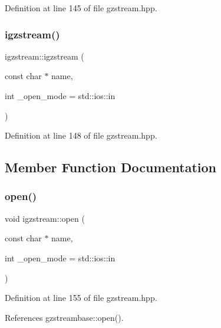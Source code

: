 Definition at line 145 of file gzstream.\+hpp.

\mbox{\label{classigzstream_ae94e48ef452b7009e93a814c48e5924e}} 
\subsubsection{\texorpdfstring{igzstream()}{igzstream()}\hspace{0.1cm}{\footnotesize\ttfamily [2/2]}}
{\footnotesize\ttfamily igzstream\+::igzstream (\begin{DoxyParamCaption}\item[{const char $\ast$}]{name,  }\item[{int}]{\+\_\+open\+\_\+mode = {\ttfamily std\+:\+:ios\+:\+:in} }\end{DoxyParamCaption})\hspace{0.3cm}{\ttfamily [inline]}}



Definition at line 148 of file gzstream.\+hpp.



\subsection{Member Function Documentation}
\mbox{\label{classigzstream_afce1810a57bef9b7ebf9e67c645fa6b9}} 
\subsubsection{\texorpdfstring{open()}{open()}}
{\footnotesize\ttfamily void igzstream\+::open (\begin{DoxyParamCaption}\item[{const char $\ast$}]{name,  }\item[{int}]{\+\_\+open\+\_\+mode = {\ttfamily std\+:\+:ios\+:\+:in} }\end{DoxyParamCaption})\hspace{0.3cm}{\ttfamily [inline]}}



Definition at line 155 of file gzstream.\+hpp.



References gzstreambase\+::open().

